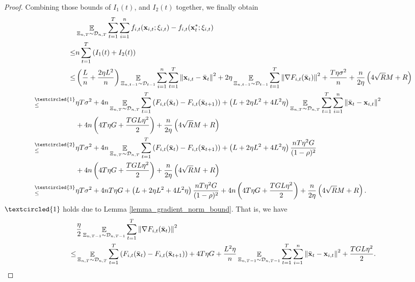 \documentclass{article}
\begin{document}
\begin{proof}
 
Combining those bounds of $I_1(t)$, and $I_2(t)$ together, we finally obtain
\begin{align}
\nonumber
& \EE_{ \Xi_{n,T} \sim \Dcal_{n,T} } \sum_{t=1}^T\sum_{i=1}^n f_{i,t}(\x_{i,t};\xi_{i,t}) - f_{i,t}(\x_t^\ast;\xi_{i,t}) \\ \nonumber
\le & n \sum_{t=1}^T \lrincir{ I_1(t) + I_2(t) } \\ \nonumber
\le & \lrincir{ \frac{L}{n} + \frac{2\eta L^2}{n} }\EE_{ \Xi_{n,t-1} \sim \Dcal_{t-1} }\sum_{i=1}^n\sum_{t=1}^T\lrnorm{\x_{i,t} - \bar{\x}_t }^2   + 2\eta  \EE_{ \Xi_{n,t-1} \sim \Dcal_{t-1} }\sum_{t=1}^T\lrnorm{\nabla F_{i,t}(\bar{\x}_t)}^2 + \frac{T\eta  \sigma^2}{n}   + \frac{n}{2\eta}\lrincir{ 4\sqrt{R}M + R  } \\ \nonumber
\refabovecir{\le}{\textcircled{1}} & \eta T \sigma^2 + 4n \EE_{ \Xi_{n,T} \sim \Dcal_{n,T} } \sum_{t=1}^T  \lrincir{F_{i,t}(\bar{\x}_t) - F_{i,t}(\bar{\x}_{t+1})}  +  \lrincir{L + 2\eta L^2  + 4L^2 \eta}  \EE_{ \Xi_{n,T} \sim \Dcal_{n,T} }\sum_{t=1}^T\sum_{i=1}^n \lrnorm{ \bar{\x}_t - \x_{i,t} }^2  \\ \nonumber
& + 4n \lrincir{ 4T  \eta G + \frac{TGL\eta^2}{2} }  + \frac{n}{2\eta}\lrincir{ 4\sqrt{R}M + R  }\\ \nonumber
\refabovecir{\le}{\textcircled{2}} & \eta T \sigma^2 + 4n \EE_{ \Xi_{n,T} \sim \Dcal_{n,T} } \sum_{t=1}^T  \lrincir{F_{i,t}(\bar{\x}_t) - F_{i,t}(\bar{\x}_{t+1})}  +  \lrincir{ L + 2\eta L^2  + 4L^2 \eta}  \frac{nT\eta^2 G }{(1-\rho)^2}  \\ \nonumber
& + 4n \lrincir{ 4T  \eta G + \frac{TGL\eta^2}{2} }  + \frac{n}{2\eta}\lrincir{ 4\sqrt{R}M + R  } \\ \nonumber
\refabovecir{\le}{\textcircled{3}} & \eta T \sigma^2 + 4n  T\eta G  + \lrincir{ L + 2\eta L^2  + 4L^2 \eta}  \frac{nT\eta^2 G }{(1-\rho)^2}  + 4n\lrincir{ 4T  \eta G + \frac{TGL\eta^2}{2} }  + \frac{n}{2\eta}\lrincir{ 4\sqrt{R}M + R  }.
\end{align}  
$\textcircled{1}$ holds due to Lemma \ref{lemma_gradient_norm_bound}. That is, we have
\begin{align}
\nonumber
& \frac{\eta}{2} \EE_{ \Xi_{n,T-1} \sim \Dcal_{n,T-1} }\sum_{t=1}^T \lrnorm{\nabla F_{i,t}(\bar{\x}_t)}^2 \\ \nonumber
\le & \EE_{ \Xi_{n,T} \sim \Dcal_{n,T} } \sum_{t=1}^T  \lrincir{F_{i,t}(\bar{\x}_t) - F_{i,t}(\bar{\x}_{t+1})} + 4T  \eta G + \frac{ L^2 \eta}{n}\EE_{ \Xi_{n,T-1} \sim \Dcal_{n,T-1} }\sum_{t=1}^T\sum_{i=1}^n \lrnorm{ \bar{\x}_t - \x_{i,t} }^2 + \frac{TGL\eta^2}{2}.

\end{align}
\end{proof}
\end{document}
